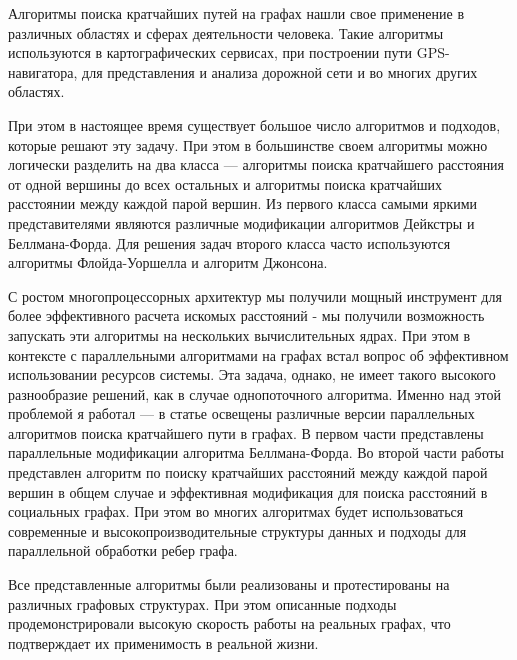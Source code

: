 \startprefacepage

Алгоритмы поиска кратчайших путей на графах нашли свое применение в различных областях и сферах деятельности человека. Такие алгоритмы используются в картографических сервисах, при построении пути GPS-навигатора, для представления и анализа дорожной сети и во многих других областях.
 
При этом в настоящее время существует большое число алгоритмов и подходов, которые решают эту задачу. При этом в большинстве своем алгоритмы можно логически разделить на два класса --- алгоритмы поиска кратчайшего расстояния от одной вершины до всех остальных и алгоритмы поиска кратчайших расстоянии между каждой парой вершин. Из первого класса самыми яркими представителями являются различные модификации алгоритмов Дейкстры и Беллмана-Форда. Для решения задач второго класса часто используются алгоритмы Флойда-Уоршелла и алгоритм Джонсона. 

С ростом многопроцессорных архитектур мы получили мощный инструмент для более эффективного расчета искомых расстояний - мы получили возможность запускать эти алгоритмы на нескольких вычислительных ядрах. При этом в контексте с параллельными алгоритмами на графах встал вопрос об эффективном использовании ресурсов системы. Эта задача, однако, не имеет такого высокого разнообразие решений, как в случае однопоточного алгоритма. Именно над этой проблемой я работал --- в статье освещены различные версии параллельных алгоритмов поиска кратчайшего пути в графах. В первом части представлены параллельные модификации алгоритма Беллмана-Форда. Во второй части работы представлен алгоритм по поиску кратчайших расстояний между каждой парой вершин в общем случае и эффективная модификация для поиска расстояний в социальных графах. При этом во многих алгоритмах будет использоваться современные и высокопроизводительные структуры данных и подходы для параллельной обработки ребер графа.

Все представленные алгоритмы были реализованы и протестированы на различных графовых структурах. При этом описанные подходы продемонстрировали высокую скорость работы на реальных графах, что подтверждает их применимость в реальной жизни.
\FloatBarrier

